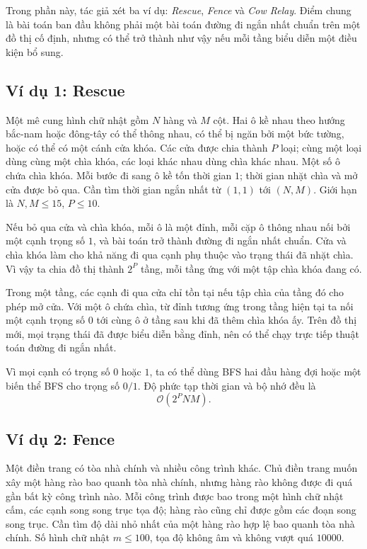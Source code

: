 \documentclass[11pt]{article}
\newcommand{\Oh}{\mathcal{O}}
\begin{document}
Trong phần này, tác giả xét ba ví dụ: \textit{Rescue}, \textit{Fence} và
\textit{Cow Relay}. Điểm chung là bài toán ban đầu không phải một bài toán
đường đi ngắn nhất chuẩn trên một đồ thị cố định, nhưng có thể trở thành như
vậy nếu mỗi tầng biểu diễn một điều kiện bổ sung.

\subsection{Ví dụ 1: Rescue}

Một mê cung hình chữ nhật gồm \(N\) hàng và \(M\) cột. Hai ô kề nhau theo
hướng bắc-nam hoặc đông-tây có thể thông nhau, có thể bị ngăn bởi một bức
tường, hoặc có thể có một cánh cửa khóa. Các cửa được chia thành \(P\) loại;
cùng một loại dùng cùng một chìa khóa, các loại khác nhau dùng chìa khác
nhau. Một số ô chứa chìa khóa. Mỗi bước đi sang ô kề tốn thời gian \(1\);
thời gian nhặt chìa và mở cửa được bỏ qua. Cần tìm thời gian ngắn nhất từ
\((1,1)\) tới \((N,M)\). Giới hạn là \(N,M\le 15\), \(P\le 10\).

Nếu bỏ qua cửa và chìa khóa, mỗi ô là một đỉnh, mỗi cặp ô thông nhau nối bởi
một cạnh trọng số \(1\), và bài toán trở thành đường đi ngắn nhất chuẩn. Cửa
và chìa khóa làm cho khả năng đi qua cạnh phụ thuộc vào trạng thái đã nhặt
chìa. Vì vậy ta chia đồ thị thành \(2^P\) tầng, mỗi tầng ứng với một tập chìa
khóa đang có.

Trong một tầng, các cạnh đi qua cửa chỉ tồn tại nếu tập chìa của tầng đó cho
phép mở cửa. Với một ô chứa chìa, từ đỉnh tương ứng trong tầng hiện tại ta nối
một cạnh trọng số \(0\) tới cùng ô ở tầng sau khi đã thêm chìa khóa ấy. Trên
đồ thị mới, mọi trạng thái đã được biểu diễn bằng đỉnh, nên có thể chạy trực
tiếp thuật toán đường đi ngắn nhất.

Vì mọi cạnh có trọng số \(0\) hoặc \(1\), ta có thể dùng BFS hai đầu hàng đợi
hoặc một biến thể BFS cho trọng số \(0/1\). Độ phức tạp thời gian và bộ nhớ
đều là
\[
  \Oh(2^P NM).
\]

\subsection{Ví dụ 2: Fence}

Một điền trang có tòa nhà chính và nhiều công trình khác. Chủ điền trang muốn
xây một hàng rào bao quanh tòa nhà chính, nhưng hàng rào không được đi quá
gần bất kỳ công trình nào. Mỗi công trình được bao trong một hình chữ nhật
cấm, các cạnh song song trục tọa độ; hàng rào cũng chỉ được gồm các đoạn song
song trục. Cần tìm độ dài nhỏ nhất của một hàng rào hợp lệ bao quanh tòa nhà
chính. Số hình chữ nhật \(m\le 100\), tọa độ không âm và không vượt quá
\(10000\).
\end{document}
